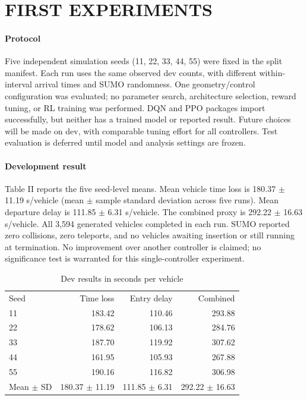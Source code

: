 \documentclass[conference]{IEEEtran}
\begin{document}
\section{FIRST EXPERIMENTS}
\paragraph{Protocol} Five independent simulation seeds (11, 22, 33, 44, 55) were fixed in the split manifest. Each run uses the same observed dev counts, with different within-interval arrival times and SUMO randomness. One geometry/control configuration was evaluated; no parameter search, architecture selection, reward tuning, or RL training was performed. DQN and PPO packages import successfully, but neither has a trained model or reported result. Future choices will be made on dev, with comparable tuning effort for all controllers. Test evaluation is deferred until model and analysis settings are frozen.

\paragraph{Development result} Table II reports the five seed-level means. Mean vehicle time loss is 180.37 $\pm$ 11.19 s/vehicle (mean $\pm$ sample standard deviation across five runs). Mean departure delay is 111.85 $\pm$ 6.31 s/vehicle. The combined proxy is 292.22 $\pm$ 16.63 s/vehicle. All 3,594 generated vehicles completed in each run. SUMO reported zero collisions, zero teleports, and no vehicles awaiting insertion or still running at termination. No improvement over another controller is claimed; no significance test is warranted for this single-controller experiment.

\begin{table}[ht]
\centering\footnotesize
\caption{Dev results in seconds per vehicle}
\begin{tabular}{lrrr}\hline
Seed & Time loss & Entry delay & Combined \\
11 & 183.42 & 110.46 & 293.88 \\
22 & 178.62 & 106.13 & 284.76 \\
33 & 187.70 & 119.92 & 307.62 \\
44 & 161.95 & 105.93 & 267.88 \\
55 & 190.16 & 116.82 & 306.98 \\
Mean $\pm$ SD & 180.37 $\pm$ 11.19 & 111.85 $\pm$ 6.31 & 292.22 $\pm$ 16.63 \\
\hline\end{tabular}
\end{table}
\end{document}
